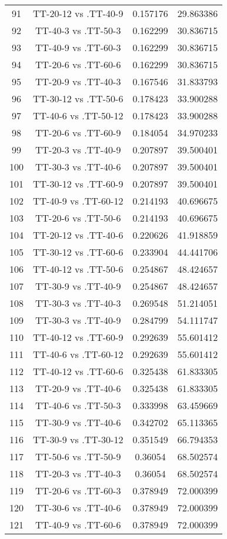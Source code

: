 \documentclass[a4paper,10pt]{article}
\begin{document}
\begin{landscape}
\begin{table}[!htp]
\begin{tabular}{cccc}
91&TT-20-12 vs .TT-40-9&0.157176&29.863386\\
92&TT-40-3 vs .TT-50-3&0.162299&30.836715\\
93&TT-40-9 vs .TT-60-3&0.162299&30.836715\\
94&TT-20-6 vs .TT-60-6&0.162299&30.836715\\
95&TT-20-9 vs .TT-40-3&0.167546&31.833793\\
96&TT-30-12 vs .TT-50-6&0.178423&33.900288\\
97&TT-40-6 vs .TT-50-12&0.178423&33.900288\\
98&TT-20-6 vs .TT-60-9&0.184054&34.970233\\
99&TT-20-3 vs .TT-40-9&0.207897&39.500401\\
100&TT-30-3 vs .TT-40-6&0.207897&39.500401\\
101&TT-30-12 vs .TT-60-9&0.207897&39.500401\\
102&TT-40-9 vs .TT-60-12&0.214193&40.696675\\
103&TT-20-6 vs .TT-50-6&0.214193&40.696675\\
104&TT-20-12 vs .TT-40-6&0.220626&41.918859\\
105&TT-30-12 vs .TT-60-6&0.233904&44.441706\\
106&TT-40-12 vs .TT-50-6&0.254867&48.424657\\
107&TT-30-9 vs .TT-40-9&0.254867&48.424657\\
108&TT-30-3 vs .TT-40-3&0.269548&51.214051\\
109&TT-30-3 vs .TT-40-9&0.284799&54.111747\\
110&TT-40-12 vs .TT-60-9&0.292639&55.601412\\
111&TT-40-6 vs .TT-60-12&0.292639&55.601412\\
112&TT-40-12 vs .TT-60-6&0.325438&61.833305\\
113&TT-20-9 vs .TT-40-6&0.325438&61.833305\\
114&TT-40-6 vs .TT-50-3&0.333998&63.459669\\
115&TT-30-9 vs .TT-40-6&0.342702&65.113365\\
116&TT-30-9 vs .TT-30-12&0.351549&66.794353\\
117&TT-50-6 vs .TT-50-9&0.36054&68.502574\\
118&TT-20-3 vs .TT-40-3&0.36054&68.502574\\
119&TT-20-6 vs .TT-60-3&0.378949&72.000399\\
120&TT-30-6 vs .TT-40-6&0.378949&72.000399\\
121&TT-40-9 vs .TT-60-6&0.378949&72.000399\\

\end{tabular}
\end{table}
\end{landscape}
\end{document}
